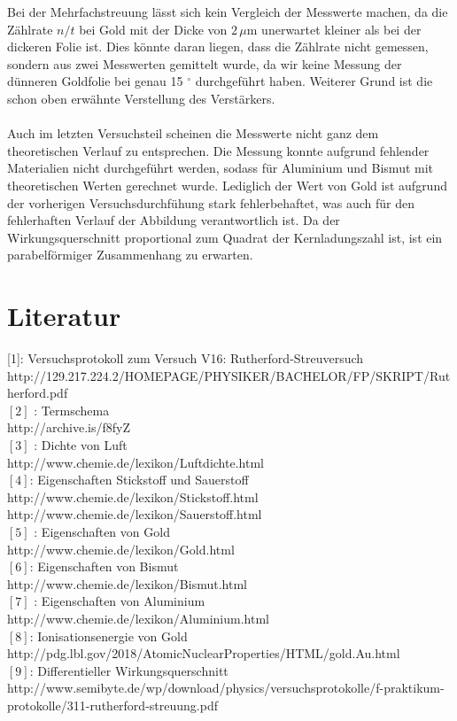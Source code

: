 \documentclass{article}
\begin{document}
Bei der Mehrfachstreuung lässt sich kein Vergleich der Messwerte machen, da die Zählrate $n/t$ bei Gold mit der Dicke von $2\, \mu$m unerwartet kleiner als bei der dickeren Folie ist. Dies könnte daran liegen, dass die Zählrate nicht gemessen, sondern aus zwei Messwerten gemittelt wurde, da wir keine Messung der dünneren Goldfolie bei genau 15 $^{\circ}$ durchgeführt haben. Weiterer Grund ist die schon oben erwähnte Verstellung des Verstärkers. \\\\
Auch im letzten Versuchsteil scheinen die Messwerte nicht ganz dem theoretischen Verlauf zu entsprechen. Die Messung konnte aufgrund fehlender Materialien nicht durchgeführt werden, sodass für Aluminium und Bismut mit theoretischen Werten gerechnet wurde. Lediglich der Wert von Gold ist aufgrund der vorherigen Versuchsdurchfühung stark fehlerbehaftet, was auch für den fehlerhaften Verlauf der Abbildung verantwortlich ist. Da der Wirkungsquerschnitt proportional zum Quadrat der Kernladungszahl ist, ist ein parabelförmiger Zusammenhang zu erwarten. 

\section{Literatur}
[1]: Versuchsprotokoll zum Versuch V16: Rutherford-Streuversuch \\ http://129.217.224.2/HOMEPAGE/PHYSIKER/BACHELOR/FP/SKRIPT/Rutherford.pdf 
\\ $[2]$ : Termschema
\\  http://archive.is/f8fyZ
\\ $[3]$ : Dichte von Luft \\
http://www.chemie.de/lexikon/Luftdichte.html\\
$[4]$: Eigenschaften Stickstoff und Sauerstoff \\
http://www.chemie.de/lexikon/Stickstoff.html\\
http://www.chemie.de/lexikon/Sauerstoff.html
\\ $[5]$ : Eigenschaften von Gold \\ http://www.chemie.de/lexikon/Gold.html
\\ $[6]$: Eigenschaften von Bismut \\ 
http://www.chemie.de/lexikon/Bismut.html 
\\ $[7]$ : Eigenschaften von Aluminium \\
http://www.chemie.de/lexikon/Aluminium.html  
\\ $[8]$: Ionisationsenergie von Gold \\
http://pdg.lbl.gov/2018/AtomicNuclearProperties/HTML/gold.Au.html\\
$[9]$: Differentieller Wirkungsquerschnitt\\
http://www.semibyte.de/wp/download/physics/versuchsprotokolle/f-praktikum-protokolle/311-rutherford-streuung.pdf\\
\end{document}
